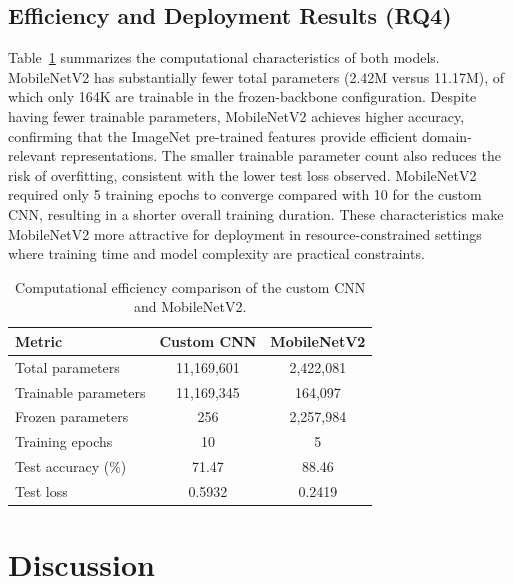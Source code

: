 \documentclass[preprint,12pt]{elsarticle}
\begin{document}
\subsection{Efficiency and Deployment Results (RQ4)}
Table~\ref{tab:Efficiency} summarizes the computational characteristics
of both models.
MobileNetV2 has substantially fewer total parameters (2.42M versus
11.17M), of which only 164K are trainable in the frozen-backbone
configuration.
Despite having fewer trainable parameters, MobileNetV2 achieves higher
accuracy, confirming that the ImageNet pre-trained features provide
efficient domain-relevant representations.
The smaller trainable parameter count also reduces the risk of
overfitting, consistent with the lower test loss observed.
MobileNetV2 required only 5 training epochs to converge compared with
10 for the custom CNN, resulting in a shorter overall training
duration.
These characteristics make MobileNetV2 more attractive for deployment
in resource-constrained settings where training time and model
complexity are practical constraints.

\begin{table}[!ht]
\centering
\caption{Computational efficiency comparison of the custom CNN and
MobileNetV2.}
\label{tab:Efficiency}
\begin{tabular}{|l|c|c|}
\hline
\textbf{Metric} & \textbf{Custom CNN} & \textbf{MobileNetV2} \\
\hline
Total parameters      & 11{,}169{,}601 & 2{,}422{,}081 \\
Trainable parameters  & 11{,}169{,}345 & 164{,}097     \\
Frozen parameters     & 256            & 2{,}257{,}984  \\
Training epochs       & 10             & 5              \\
Test accuracy (\%)    & 71.47          & 88.46          \\
Test loss             & 0.5932         & 0.2419         \\
\hline
\end{tabular}
\end{table}

\section{Discussion}
\end{document}
